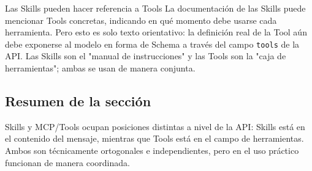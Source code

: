 \begin{knowledgebox}{Las Skills pueden hacer referencia a Tools}
La documentación de las Skills puede mencionar Tools concretas, indicando en qué momento debe usarse cada herramienta. Pero esto es solo texto orientativo: la definición real de la Tool aún debe exponerse al modelo en forma de Schema a través del campo \texttt{tools} de la API. Las Skills son el "manual de instrucciones" y las Tools son la "caja de herramientas"; ambas se usan de manera conjunta.
\end{knowledgebox}

\subsection{Resumen de la sección}

Skills y MCP/Tools ocupan posiciones distintas a nivel de la API: Skills está en el contenido del mensaje, mientras que Tools está en el campo de herramientas. Ambos son técnicamente ortogonales e independientes, pero en el uso práctico funcionan de manera coordinada.

